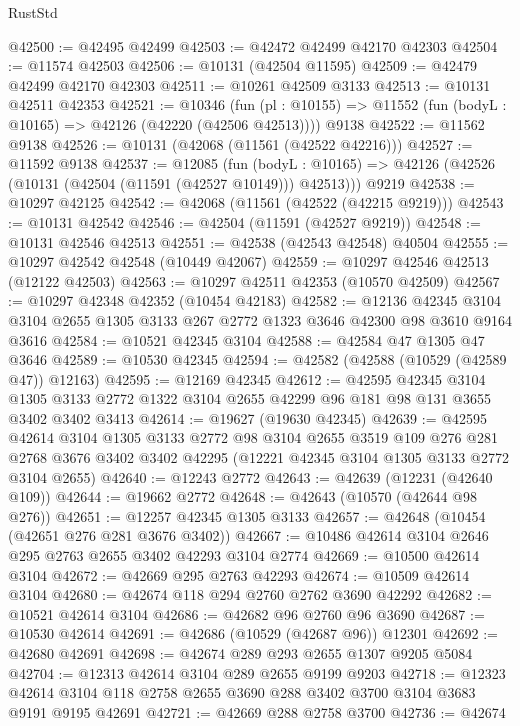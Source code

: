 \begin{lexlean}{RustStd}
\begin{coremodule}
@42500 := @42495 @42499
@42503 := @42472 @42499 @42170 @42303
@42504 := @11574 @42503
@42506 := @10131 (@42504 @11595)
@42509 := @42479 @42499 @42170 @42303
@42511 := @10261 @42509 @3133
@42513 := @10131 @42511 @42353
@42521 := @10346
    (fun (pl : @10155) => @11552 (fun (bodyL : @10165) => @42126 (@42220 (@42506 @42513))))
    @9138
@42522 := @11562 @9138
@42526 := @10131 (@42068 (@11561 (@42522 @42216)))
@42527 := @11592 @9138
@42537 := @12085
    (fun (bodyL : @10165) => @42126 (@42526 (@10131 (@42504 (@11591 (@42527 @10149))) @42513)))
    @9219
@42538 := @10297 @42125
@42542 := @42068 (@11561 (@42522 (@42215 @9219)))
@42543 := @10131 @42542
@42546 := @42504 (@11591 (@42527 @9219))
@42548 := @10131 @42546 @42513
@42551 := @42538 (@42543 @42548) @40504
@42555 := @10297 @42542 @42548 (@10449 @42067)
@42559 := @10297 @42546 @42513 (@12122 @42503)
@42563 := @10297 @42511 @42353 (@10570 @42509)
@42567 := @10297 @42348 @42352 (@10454 @42183)
@42582 := @12136
    @42345
    @3104
    @3104
    @2655
    @1305
    @3133
    @267
    @2772
    @1323
    @3646
    @42300
    @98
    @3610
    @9164
    @3616
@42584 := @10521 @42345 @3104
@42588 := @42584 @47 @1305 @47 @3646
@42589 := @10530 @42345
@42594 := @42582 (@42588 (@10529 (@42589 @47)) @12163)
@42595 := @12169 @42345
@42612 := @42595
    @42345
    @3104
    @1305
    @3133
    @2772
    @1322
    @3104
    @2655
    @42299
    @96
    @181
    @98
    @131
    @3655
    @3402
    @3402
    @3413
@42614 := @19627 (@19630 @42345)
@42639 := @42595
    @42614
    @3104
    @1305
    @3133
    @2772
    @98
    @3104
    @2655
    @3519
    @109
    @276
    @281
    @2768
    @3676
    @3402
    @3402
    @42295
    (@12221 @42345 @3104 @1305 @3133 @2772 @3104 @2655)
@42640 := @12243 @2772
@42643 := @42639 (@12231 (@42640 @109))
@42644 := @19662 @2772
@42648 := @42643 (@10570 (@42644 @98 @276))
@42651 := @12257 @42345 @1305 @3133
@42657 := @42648 (@10454 (@42651 @276 @281 @3676 @3402))
@42667 := @10486 @42614 @3104 @2646 @295 @2763 @2655 @3402 @42293 @3104 @2774
@42669 := @10500 @42614 @3104
@42672 := @42669 @295 @2763 @42293
@42674 := @10509 @42614 @3104
@42680 := @42674 @118 @294 @2760 @2762 @3690 @42292
@42682 := @10521 @42614 @3104
@42686 := @42682 @96 @2760 @96 @3690
@42687 := @10530 @42614
@42691 := @42686 (@10529 (@42687 @96)) @12301
@42692 := @42680 @42691
@42698 := @42674 @289 @293 @2655 @1307 @9205 @5084
@42704 := @12313 @42614 @3104 @289 @2655 @9199 @9203
@42718 := @12323 @42614 @3104 @118 @2758 @2655 @3690 @288 @3402 @3700 @3104 @3683 @9191 @9195 @42691
@42721 := @42669 @288 @2758 @3700
@42736 := @42674

\end{coremodule}
\end{lexlean}
